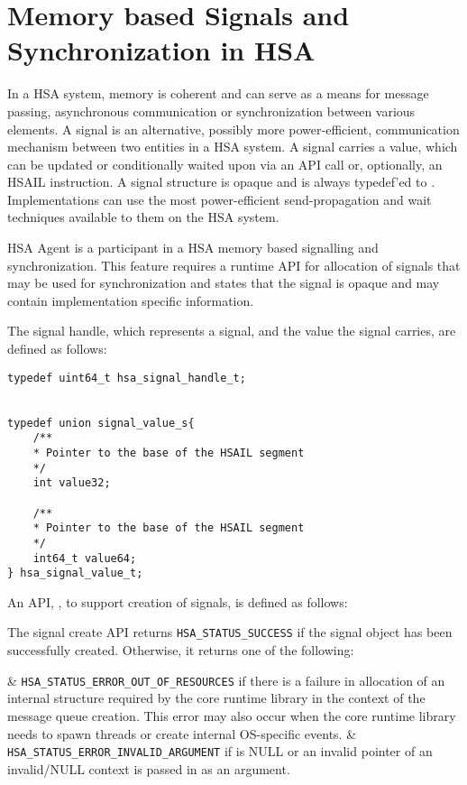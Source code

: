 \hypertarget{signals}{}\section{Memory based Signals and
Synchronization in H\-S\-A}\label{signals}

In a HSA system, memory is coherent and can serve as a means for
message passing, asynchronous communication or synchronization
between various elements.  A signal is an alternative, possibly more
power-efficient, communication mechanism between two entities in a
H\-S\-A system. A signal carries a value, which can be updated or
conditionally waited upon via an API call or, optionally, an HSAIL
instruction. A signal structure is opaque and is
always typedef'ed to . 
Implementations can use the most power-efficient send-propagation
and wait techniques available to them on the HSA system.  

HSA Agent is a
participant in a HSA memory based signalling and synchronization.
This feature requires a
runtime API for allocation of signals that may be used for
synchronization and states that the signal is opaque and may contain
implementation specific information.  

The signal handle, which represents a signal, and the value the
signal carries, are defined as follows:

\begin{lstlisting}
typedef uint64_t hsa_signal_handle_t;


typedef union signal_value_s{
    /**
    * Pointer to the base of the HSAIL segment
    */
    int value32;

    /**
    * Pointer to the base of the HSAIL segment
    */
    int64_t value64;
} hsa_signal_value_t;
\end{lstlisting}

An API, , to support
creation of signals, is defined as follows:



The signal create API returns \texttt{HSA\_STATUS\_SUCCESS} if the
signal object has been successfully created. Otherwise, it returns
one of the following:

\begin{easylist}
& \texttt{HSA\_STATUS\_ERROR\_OUT\_OF\_RESOURCES} if there is a failure
in allocation of an internal structure required by the core runtime
library in the context of the message queue creation. This error may
also occur when the core runtime library needs to spawn threads or
create internal OS-specific events. 
& \texttt{HSA\_STATUS\_ERROR\_INVALID\_ARGUMENT} if {\itshape
{}} is NULL or an invalid pointer of an invalid/NULL
context is passed in as an argument.
\end{easylist}

